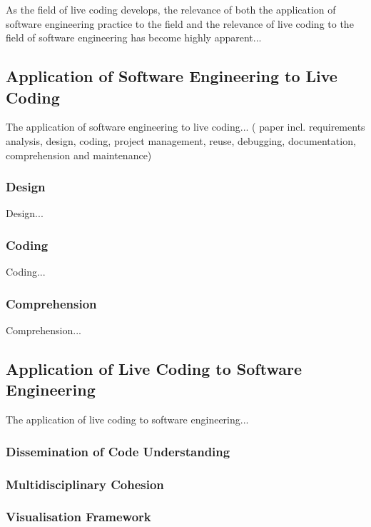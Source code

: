 As the field of live coding develops, the relevance of both the application of software engineering practice to the field and the relevance of live coding to the field of software engineering has become highly apparent...

\subsection{Application of Software Engineering to Live Coding}
The application of software engineering to live coding...
(\cite{Blackwell2005} paper incl. requirements analysis, design, coding, project management, reuse, debugging, documentation, comprehension and maintenance)

\subsubsection{Design}
Design...
\subsubsection{Coding}
Coding...
\subsubsection{Comprehension}
Comprehension...

\subsection{Application of Live Coding to Software Engineering}
The application of live coding to software engineering...

\subsubsection{Dissemination of Code Understanding}


\subsubsection{Multidisciplinary Cohesion}

\subsubsection{Visualisation Framework}






